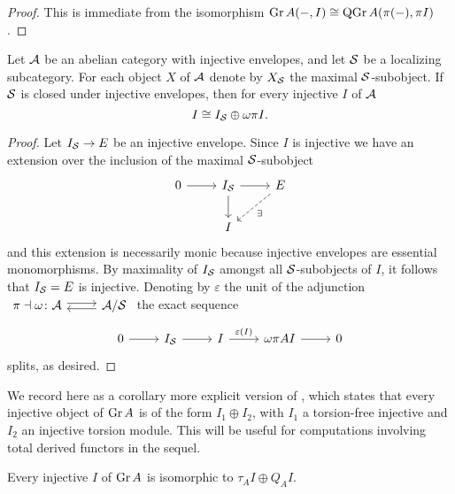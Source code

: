 \begin{proof}
  This is immediate from the isomorphism \(\operatorname{Gr}A(-, I) \cong \operatorname{QGr}A(\pi(-), \pi{I})\).
\end{proof}

\begin{proposition}\label{prop: decomposition of injectives}
  Let \(\mathcal{A}\) be an abelian category with injective envelopes, and let \(\mathcal{S}\) be a localizing subcategory.
  For each object \(X\) of \(\mathcal{A}\) denote by \(X_{\mathcal{S}}\) the maximal \(\mathcal{S}\)-subobject.
  If \(\mathcal{S}\) is closed under injective envelopes, then for every injective \(I\) of \(\mathcal{A}\)
  \[I \cong I_{\mathcal{S}} \oplus \omega\pi{I}.\]
\end{proposition}

\begin{proof}
  Let \(I_{\mathcal{S}} \to E\) be an injective envelope.
  Since \(I\) is injective we have an extension over the inclusion of the maximal \(\mathcal{S}\)-subobject
  \[\begin{tikzcd}
  0 \arrow{r} & I_\Serre \arrow{r}\arrow{d} & E \arrow[dashed]{ld}{\exists}\\
  & I
  \end{tikzcd}\]
  and this extension is necessarily monic because injective envelopes are essential monomorphisms.
  By maximality of \(I_{\mathcal{S}}\) amongst all \(\mathcal{S}\)-subobjects of \(I\), it follows that \(I_{\mathcal{S}} = E\) is injective.
  Denoting by \(\varepsilon\) the unit of the adjunction
  \(\begin{tikzcd}
  \pi \dashv \omega \colon \A \arrow[shift left=.5ex]{r} & \A/\Serre \arrow[shift left=.5ex]{l}
  \end{tikzcd}\)
  the exact sequence
  \[\begin{tikzcd}
  0 \arrow{r} & I_\Serre \arrow{r} & I \arrow{r}{\varepsilon(I)} & \omega\pi{A} I \arrow{r} & 0
  \end{tikzcd}\]  splits, as desired.
\end{proof}
We record here as a corollary more explicit version of \parencite[Prop 7.1 (5)]{AZ94}, which states that every injective object of \(\operatorname{Gr}A\) is of the form \(I_1 \oplus I_2\), with \(I_1\) a torsion-free injective and \(I_2\) an injective torsion module.
This will be useful for computations involving total derived functors in the sequel.

\begin{corollary} \label{cor: Gr injectives}
  Every injective \(I\) of \(\operatorname{Gr}A\) is isomorphic to \(\tau_A I \oplus Q_A I\).

\end{corollary}

